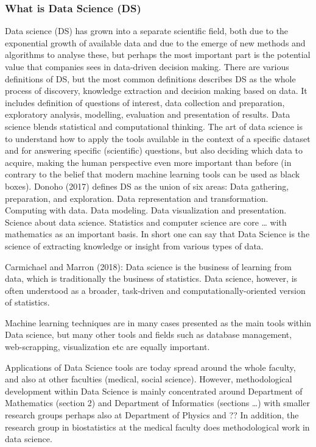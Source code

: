\documentclass[a4paper,10pt]{article}
\begin{document}
\subsubsection*{What is Data Science (DS)}
Data science (DS) has grown into a separate scientific field, both due to the exponential growth of available data and due to the emerge of new methods and algorithms to analyse these, but perhaps the most important part is the potential value that companies sees in data-driven decision making. 
There are various definitions of DS, but the most common definitions describes DS as the whole process of discovery, knowledge extraction and decision making based on data. It includes definition of questions of interest, data collection and preparation, exploratory analysis, modelling, evaluation and presentation of results.  
Data science blends statistical and computational thinking. The art of data science is to understand how to apply the tools available in the context of a specific dataset and for answering specific (scientific) questions, but also deciding which data to acquire, making the human perspective even more important than before (in contrary to the belief that modern machine learning tools can be used as black boxes).
Donoho (2017) defines DS as the union of six areas:
Data gathering, preparation, and exploration.
Data representation and transformation.
Computing with data.
Data modeling.
Data visualization and presentation.
Science about data science.
Statistics and computer science are core … with mathematics as an important basis. In short one can say that Data Science is the science of extracting knowledge or insight from various types of data. 

Carmichael and Marron (2018): Data science is the business of learning from data, which is traditionally the business of statistics. Data science, however, is often understood as a broader, task-driven and computationally-oriented version of statistics.

Machine learning techniques are in many cases presented as the main tools within Data science, but many other tools and fields such as database management, web-scrapping, visualization etc are equally important. 

Applications of Data Science tools are today spread around the whole faculty, and also at other faculties (medical, social science). However, methodological development within Data Science is mainly concentrated around Department of Mathematics (section 2) and Department of Informatics (sections …) with smaller research groups perhaps also at Department of Physics and ?? In addition, the research group in biostatistics at the medical faculty does methodological work in data science.
\end{document}
